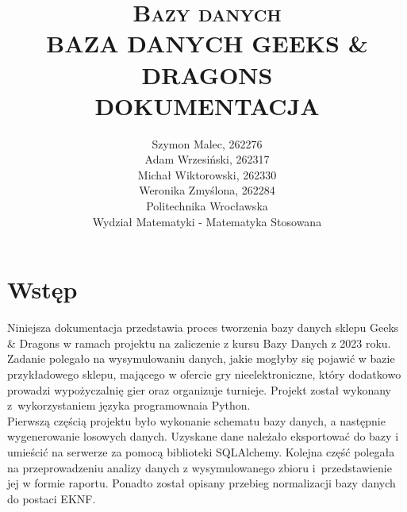 \documentclass{article}
\begin{document}
	\title{ \LARGE \textsc{Bazy danych}
		\\ [5.5cm]
		\huge \textbf{\uppercase{Baza danych Geeks \& Dragons}}
		\\ [0.5cm]
		\large \textbf{\uppercase{Dokumentacja}}
		}
	\date{}
	\maketitle
	\vspace{7.5cm}
	
	\begin{center}
	\author{
		Szymon Malec, 262276 \\
		Adam Wrzesiński, 262317\\
		Michał Wiktorowski, 262330 \\
		Weronika Zmyślona, 262284 \\
		\vspace{0.5cm}
		Politechnika Wrocławska \\
		Wydział Matematyki - Matematyka Stosowana}
	\end{center}
	
	\thispagestyle{empty}
	
	\newpage\thispagestyle{empty}
	\mbox{}
	
	\setcounter {page}{1}
	
	\tableofcontents
	
	\newpage
	\section{Wstęp}
	Niniejsza dokumentacja przedstawia proces tworzenia bazy danych sklepu Geeks \& Dragons w ramach projektu na zaliczenie z kursu Bazy Danych z 2023 roku. Zadanie polegało na wysymulowaniu danych, jakie mogłyby się pojawić w bazie przykładowego sklepu, mającego w ofercie gry nieelektroniczne, który dodatkowo prowadzi wypożyczalnię gier oraz organizuje turnieje. Projekt został wykonany z~wykorzystaniem języka programownaia Python.\\
	
	\noindent Pierwszą częścią projektu było wykonanie schematu bazy danych, a następnie wygenerowanie losowych danych. Uzyskane dane należało eksportować do bazy i umieścić na serwerze za pomocą biblioteki SQLAlchemy. Kolejna część polegała na przeprowadzeniu analizy danych z wysymulowanego zbioru i~przedstawienie jej w formie raportu. Ponadto został opisany przebieg normalizacji bazy danych do postaci EKNF. 
	
\end{document}
